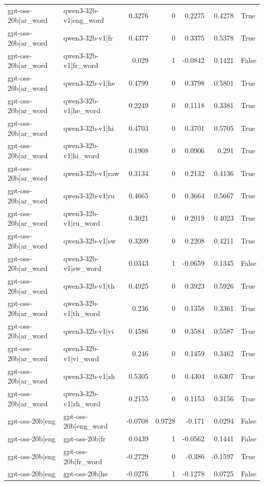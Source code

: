 \begin{table}
\begin{tabular}{l l r r r r l}
gpt-oss-20b|ar_word & qwen3-32b-v1|eng_word & 0.3276 & 0 & 0.2275 & 0.4278 & True \\
gpt-oss-20b|ar_word & qwen3-32b-v1|fr & 0.4377 & 0 & 0.3375 & 0.5378 & True \\
gpt-oss-20b|ar_word & qwen3-32b-v1|fr_word & 0.029 & 1 & -0.0842 & 0.1421 & False \\
gpt-oss-20b|ar_word & qwen3-32b-v1|he & 0.4799 & 0 & 0.3798 & 0.5801 & True \\
gpt-oss-20b|ar_word & qwen3-32b-v1|he_word & 0.2249 & 0 & 0.1118 & 0.3381 & True \\
gpt-oss-20b|ar_word & qwen3-32b-v1|hi & 0.4703 & 0 & 0.3701 & 0.5705 & True \\
gpt-oss-20b|ar_word & qwen3-32b-v1|hi_word & 0.1908 & 0 & 0.0906 & 0.291 & True \\
gpt-oss-20b|ar_word & qwen3-32b-v1|raw & 0.3134 & 0 & 0.2132 & 0.4136 & True \\
gpt-oss-20b|ar_word & qwen3-32b-v1|ru & 0.4665 & 0 & 0.3664 & 0.5667 & True \\
gpt-oss-20b|ar_word & qwen3-32b-v1|ru_word & 0.3021 & 0 & 0.2019 & 0.4023 & True \\
gpt-oss-20b|ar_word & qwen3-32b-v1|sw & 0.3209 & 0 & 0.2208 & 0.4211 & True \\
gpt-oss-20b|ar_word & qwen3-32b-v1|sw_word & 0.0343 & 1 & -0.0659 & 0.1345 & False \\
gpt-oss-20b|ar_word & qwen3-32b-v1|th & 0.4925 & 0 & 0.3923 & 0.5926 & True \\
gpt-oss-20b|ar_word & qwen3-32b-v1|th_word & 0.236 & 0 & 0.1358 & 0.3361 & True \\
gpt-oss-20b|ar_word & qwen3-32b-v1|vi & 0.4586 & 0 & 0.3584 & 0.5587 & True \\
gpt-oss-20b|ar_word & qwen3-32b-v1|vi_word & 0.246 & 0 & 0.1459 & 0.3462 & True \\
gpt-oss-20b|ar_word & qwen3-32b-v1|zh & 0.5305 & 0 & 0.4304 & 0.6307 & True \\
gpt-oss-20b|ar_word & qwen3-32b-v1|zh_word & 0.2155 & 0 & 0.1153 & 0.3156 & True \\
gpt-oss-20b|eng & gpt-oss-20b|eng_word & -0.0708 & 0.9728 & -0.171 & 0.0294 & False \\
gpt-oss-20b|eng & gpt-oss-20b|fr & 0.0439 & 1 & -0.0562 & 0.1441 & False \\
gpt-oss-20b|eng & gpt-oss-20b|fr_word & -0.2729 & 0 & -0.386 & -0.1597 & True \\
gpt-oss-20b|eng & gpt-oss-20b|he & -0.0276 & 1 & -0.1278 & 0.0725 & False \\

\end{tabular}
\end{table}
